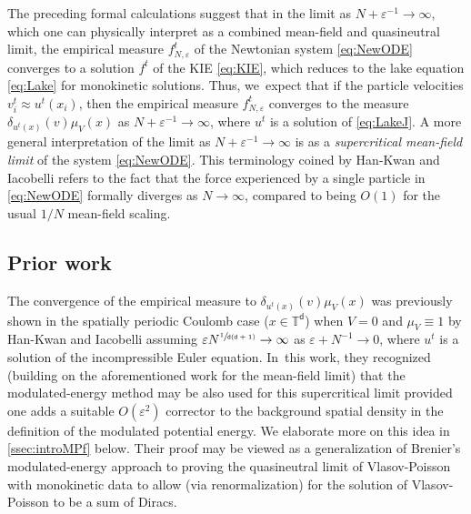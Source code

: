 \documentclass[JEP,XML,SOM,Unicode,published]{cedram}
\theoremstyle{plain}
\theoremstyle{definition}
\newcommand{\T}{{\mathbb{T}}}
\let\vep\varepsilon
\renewcommand{\d}{\mathsf{d}}
\begin{document}
The preceding formal calculations suggest that in the limit as $N +\vep^{-1}\to\infty$, which one can physically interpret as a combined mean-field and quasineutral limit, the empirical measure $f_{N,\vep}^t$ of the Newtonian system \eqref{eq:NewODE} converges to a solution $f^t$ of the KIE \eqref{eq:KIE}, which reduces to the lake equation \eqref{eq:Lake} for monokinetic solutions. Thus, we~expect that if the particle velocities $v_i^t \approx u^t(x_i)$, then the empirical measure $f_{N,\vep}^t$ converges to the measure $\delta_{u^t(x)}(v)\mu_V(x)$ as $N+\vep^{-1}\to\infty$, where $u^t$ is a solution of \eqref{eq:LakeJ}. A more general interpretation of the limit as $N +\vep^{-1}\to\infty$ is as a \emph{supercritical mean-field limit} of the system \eqref{eq:NewODE}. This terminology coined by Han-Kwan and Iacobelli \cite{HkI2021} refers to the fact that the force experienced by a single particle in \eqref{eq:NewODE} formally diverges as $N\to\infty$, compared to being $O(1)$ for the usual $1/N$ mean-field scaling.

\subsection{Prior work}\label{ssec:introPW}

The convergence of the empirical measure to $\delta_{u^t(x)}(v)\mu_V(x)$ was previously shown in the spatially periodic Coulomb case (\ie $x\in\T^\d$) when $V=0$ and $\mu_V\equiv 1$ by Han-Kwan and Iacobelli \cite{HkI2021} assuming $\vep N^{\sfrac{1}{\d(\d+1)}} \to \infty$ as $\vep+N^{-1}\to 0$, where $u^t$ is a solution of the incompressible Euler equation. In~this work, they recognized (building on the aforementioned work \cite[App.]{Serfaty2020} for the mean-field limit) that the modulated-energy method may be also used for this supercritical limit provided one adds a suitable $O(\vep^2)$ corrector to the background spatial density in the definition of the modulated potential energy. We elaborate more on this idea in \cref{ssec:introMPf} below. Their proof may be viewed as a generalization of Brenier's \cite{Brenier2000} modulated-energy approach to proving the quasineutral limit of Vlasov-Poisson with monokinetic data to allow (via renormalization) for the solution of Vlasov-Poisson to be a sum of Diracs.
\end{document}

